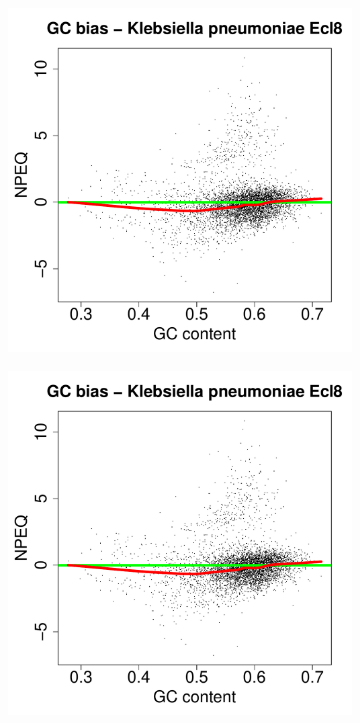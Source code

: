 \documentclass[12pt,letterpaper]{article}
\begin{document}
\begin{figure}
\captionsetup[subfigure]{justification=centering}
\begin{subfigure}{.49\textwidth}
  \centering
  \includegraphics[page=26, scale=0.25]{biases.pdf}
  \caption{}
  \label{fig:distance-bias}
\end{subfigure}
\begin{subfigure}{.49\textwidth}
  \centering
  \includegraphics[page=25, scale=0.25]{biases.pdf}

\end{subfigure}
\end{figure}
\end{document}
